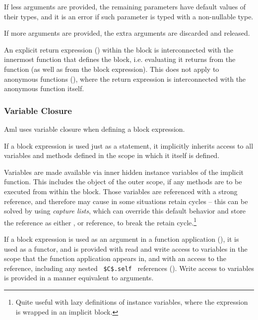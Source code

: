 If less arguments are provided, the remaining parameters have default values of their types, and it is an error if such parameter is typed with a non-nullable type. 

If more arguments are provided, the extra arguments are discarded and released. 

An explicit return expression () within the block is interconnected with the innermost function that defines the block, i.e. evaluating it returns from the function (as well as from the block expression). This does not apply to anonymous functions (), where the return expression is interconnected with the anonymous function itself. 






\subsubsection{Variable Closure}
\label{sec:variable-closure}

Aml uses variable closure when defining a block expression. 

If a block expression is used just as a statement, it implicitly inherits access to all variables and methods defined in the scope in which it itself is defined. 

Variables are made available via inner hidden instance variables of the implicit function. This includes the  object of the outer scope, if any methods are to be executed from within the block. Those variables are referenced with a strong reference, and therefore may cause in some situations retain cycles -- this can be solved by using {\em capture lists}, which can override this default behavior and store the reference as either ,  or  reference, to break the retain cycle.\footnote{Quite useful with lazy definitions of instance variables, where the expression is wrapped in an implicit block.} 

If a block expression is used as an argument in a function application (), it is used as a functor, and is provided with read and write access to variables in the scope that the function application appears in, and with an access to the  reference, including any nested ~\lstinline!$C$.self!~ references (). Write access to variables is provided in a manner equivalent to  arguments. 

